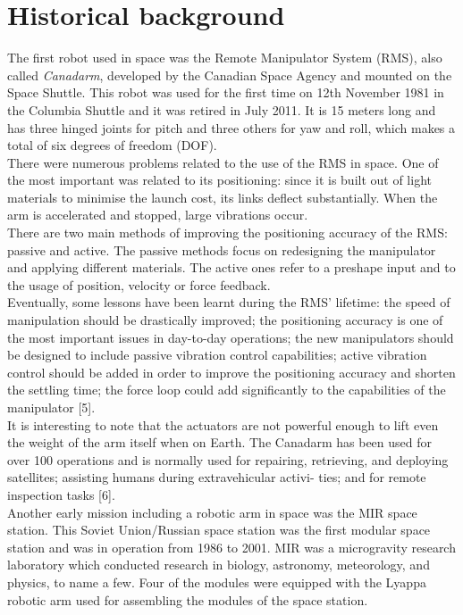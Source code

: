\documentclass[a4paper,12pt,oneside]{report}
\begin{document}
\section{Historical background}
The first robot used in space was the Remote Manipulator System (RMS), also called \textit{Canadarm}, developed by the Canadian Space Agency and mounted on the Space Shuttle. This robot was used for the first time on 12th November 1981 in the Columbia Shuttle and it was retired in July 2011. It is 15 meters long and has three hinged joints for pitch and three others for yaw and roll, which makes a total of six degrees of freedom (DOF).\\
There were numerous problems related to the use of the RMS in space. One of the most important was related to its positioning: since it is built out of light materials to minimise the launch cost, its links deflect substantially. When the arm is accelerated and stopped, large vibrations occur.\\
There are two main methods of improving the positioning accuracy of the RMS: passive and active. The passive methods focus on redesigning the manipulator and applying different materials. The active ones refer to a preshape input and to the usage of position, velocity or force feedback.\\
Eventually, some lessons have been learnt during the RMS' lifetime: the speed of manipulation should be drastically improved; the positioning accuracy is one of the most important issues in day-to-day operations; the new manipulators should be designed to include passive vibration control capabilities; active vibration control should be added in order to improve the positioning accuracy and shorten the settling time; the force loop could add significantly to the capabilities of the manipulator [5].\\
It is interesting to note that the actuators are not powerful enough to lift even the weight of the arm itself when on Earth. The Canadarm has been used for over 100 operations and is normally used for repairing, retrieving, and deploying satellites; assisting humans during extravehicular activi- ties; and for remote inspection tasks [6].\\
Another early mission including a robotic arm in space was the MIR space station. This Soviet Union/Russian space station was the first modular space station and was in operation from 1986 to 2001. MIR was a microgravity research laboratory which conducted research in biology, astronomy, meteorology, and physics, to name a few. Four of the modules were equipped with the Lyappa robotic arm used for assembling the modules of the space station.\\
\end{document}
